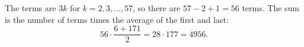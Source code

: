 The terms are $3k$ for $k=2,3,\dots,57$, so there are $57-2+1=56$ terms. The sum is the number of terms times the average of the first and last:
\[
56\cdot\dfrac{6+171}{2}=28\cdot177=\boxed{4956}.
\]
